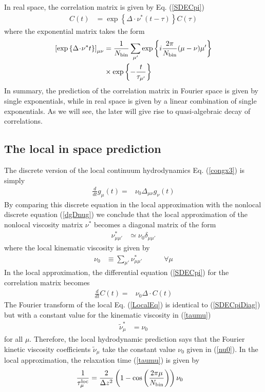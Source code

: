 \documentclass[a4paper,openright,12pt]{book}
\newcommand{\esc}{\!\cdot\!}
\begin{document}
In real space, the correlation matrix is given by Eq. (\ref{SDECpi})
\begin{align}
  C(t)&=\exp\left\{\Delta\esc \nu^* (t-\tau) \right\}C(\tau)
\label{Cmunut}
\end{align}
where the exponential matrix takes the form
\begin{align}
\left[\exp\left\{\Delta\esc \nu^* t \right\}\right]_{\mu\nu}
&=\frac{1}{N_{\rm bin}}\sum_{\mu'}\exp\left\{i\frac{2\pi}{N_{\rm bin}}(\mu-\nu)\mu'\right\}
\nonumber\\
&\times
\exp\left\{-\frac{t}{\tau_{\mu'}}\right\}
\end{align}
In summary, the prediction of the correlation matrix in Fourier space
is given  by single exponentials, while  in real space is  given by a
linear combination of  single exponentials. As we will  see, the later
will give rise to quasi-algebraic decay of correlations.

\subsection{The local in space prediction}
The   discrete   version   of  the   local   continuum   hydrodynamics
Eq. (\ref{congx3}) is simply
\begin{align}
  \frac{d}{dt}{g}_\mu(t)=&\nu_0\Delta_{\mu\nu}{g}_\nu(t)
\label{gloc}
\end{align}
By comparing  this discrete equation  in the local  approximation with
the nonlocal  discrete equation  (\ref{dgDnug}) we conclude  that the
local approximation of the nonlocal viscosity matrix $\nu^*$ becomes a
diagonal matrix of the form
\begin{align}
\nu_{\mu\mu'}^*&\simeq \nu_0 \delta_{\mu\mu'}
\end{align}
where the local kinematic viscosity is given by
\begin{align}
\nu_0&\equiv \sum_{\mu'}\nu_{\mu\mu'}^* \quad \quad \quad\forall \mu
\label{nu0}
\end{align}
In the  local approximation, the differential  equation (\ref{SDECpi})
for the correlation matrix becomes
\begin{align}
  \frac{d}{dt}{C}(t)=&\nu_0{\Delta}\esc { C}(t)
\label{LocalEq}
\end{align}
The Fourier transform of the local Eq. (\ref{LocalEq}) is identical to
(\ref{SDECpiDiag})  but  with  a  constant  value  for  the  kinematic
viscosity in (\ref{taumu})
\begin{align}
\tilde{\nu}^*_\mu&= \nu_0
\label{numunu0}
\end{align}
for all $\mu$. Therefore, the  local hydrodynamic prediction says that
the Fourier kinetic viscosity  coefficients $\tilde{\nu}_\mu$ take the
constant value $\nu_0$ given in (\ref{nu0}).
In the local approximation, the relaxation time (\ref{taumu}) is given by 
\begin{align}
 \frac{1}{\tau^{\rm loc}_\mu}&=\frac{2}{\Delta z^2}
\left(1-\cos\left( \frac{2\pi \mu}{N_{\rm bin}}\right)\right)
\nu_0
\label{taumuloc}
\end{align}
\end{document}
